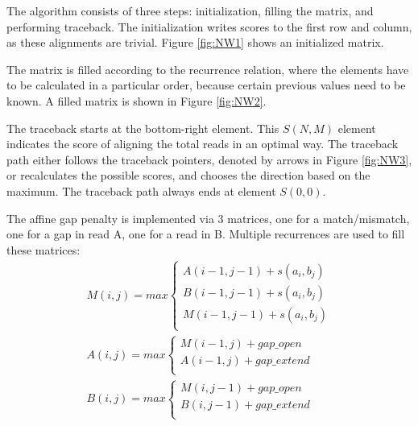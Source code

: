 \documentclass[../main/thesis.tex]{subfiles}
\begin{document}
The algorithm consists of three steps: initialization, filling the matrix, and performing traceback.
The initialization writes scores to the first row and column, as these alignments are trivial.
Figure \ref{fig:NW1} shows an initialized matrix.


The matrix is filled according to the recurrence relation, where the elements have to be calculated in a particular order, because certain previous values need to be known.
A filled matrix is shown in Figure \ref{fig:NW2}.


The traceback starts at the bottom-right element.
This $S(N,M)$ element indicates the score of aligning the total reads in an optimal way.
The traceback path either follows the traceback pointers, denoted by arrows in Figure \ref{fig:NW3}, or recalculates the possible scores, and chooses the direction based on the maximum.
The traceback path always ends at element $S(0,0)$.


The affine gap penalty is implemented via 3 matrices, one for a match/mismatch, one for a gap in read A, one for a read in B.
Multiple recurrences are used to fill these matrices:
\begin{align}
M(i,j) = max
\begin{cases}
A(i-1,j-1) + s(a_i,b_j) \\
B(i-1,j-1) + s(a_i,b_j) \\
M(i-1,j-1) + s(a_i,b_j) \\
\end{cases}
\\
A(i,j) = max
\begin{cases}
M(i-1,j) + gap\_open \\
A(i-1,j) + gap\_extend \\
\end{cases}
\\
B(i,j) = max
\begin{cases}
M(i,j-1) + gap\_open \\
B(i,j-1) + gap\_extend \\
\end{cases}
\label{eq:NW_recursion_affine}
\end{align}
\end{document}

